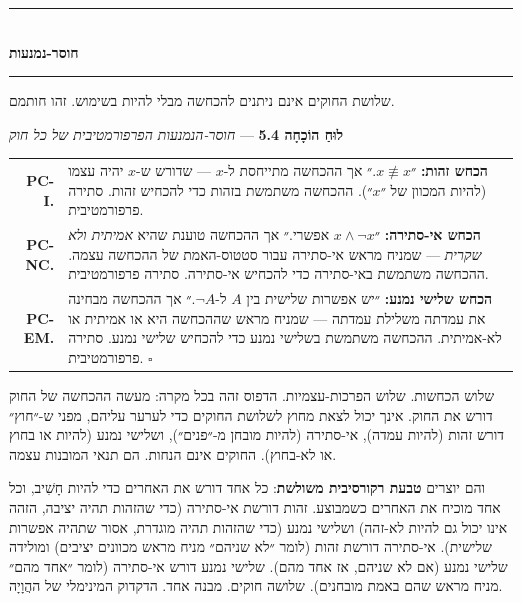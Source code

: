 \documentclass[10pt, openany, oneside]{book}
\renewcommand{\normalsize}{\fontsize{10}{13}\selectfont}
\renewcommand{\footnotesize}{\fontsize{8.5}{11}\selectfont}
\begin{document}

\begin{center}
    \rule{0.3\textwidth}{0.4pt}\\[0.5em]
    {\normalsize\bfseries\textsc{חוסר-נמנעות}}\\[0.3em]
    \rule{0.3\textwidth}{0.4pt}
\end{center}

\vspace{1em}

\noindent שלושת החוקים אינם ניתנים להכחשה מבלי להיות בשימוש. זהו חותמם.

\vspace{0.5em}

\textbf{לוּחַ הוֹכָחָה 5.4} --- \textit{חוסר-הנמנעות הפרפורמטיבית של כל חוק}

\vspace{0.5em}

{\footnotesize
\noindent\begin{tabular}{r p{}}
\textbf{PC-I.} & \textbf{הכחש זהות:} ״$x \not\equiv x$.״ אך ההכחשה מתייחסת ל-$x$ — שדורש ש-$x$ יהיה עצמו (להיות המכוון של ״$x$״). ההכחשה משתמשת בזהות כדי להכחיש זהות. סתירה פרפורמטיבית. \\[0.3em]
\textbf{PC-NC.} & \textbf{הכחש אי-סתירה:} ״$x \wedge \neg x$ אפשרי.״ אך ההכחשה טוענת שהיא \textit{אמיתית ולא שקרית} — שמניח מראש אי-סתירה עבור סטטוס-האמת של ההכחשה עצמה. ההכחשה משתמשת באי-סתירה כדי להכחיש אי-סתירה. סתירה פרפורמטיבית. \\[0.3em]
\textbf{PC-EM.} & \textbf{הכחש שלישי נמנע:} ״יש אפשרות שלישית בין $A$ ל-$\neg A$.״ אך ההכחשה מבחינה את עמדתה משלילת עמדתה — שמניח מראש שההכחשה היא או אמיתית או לא-אמיתית. ההכחשה משתמשת בשלישי נמנע כדי להכחיש שלישי נמנע. סתירה פרפורמטיבית. $\square$ \\[0.3em]
\end{tabular}
}

\vspace{0.8em}

\noindent שלוש הכחשות. שלוש הפרכות-עצמיות. הדפוס זהה בכל מקרה: מעשה ההכחשה של החוק דורש את החוק. אינך יכול לצאת מחוץ לשלושת החוקים כדי לערער עליהם, מפני ש-״חוץ״ דורש זהות (להיות עמדה), אי-סתירה (להיות מובחן מ-״פנים״), ושלישי נמנע (להיות או בחוץ או לא-בחוץ). החוקים אינם הנחות. הם תנאי המובנות עצמה.

והם יוצרים \textbf{טבעת רקורסיבית משולשת}: כל אחד דורש את האחרים כדי להיות חָשִׁיב, וכל אחד מוכיח את האחרים כשמבוצע. זהות דורשת אי-סתירה (כדי שהזהות תהיה יציבה, הזהה אינו יכול גם להיות לא-זהה) ושלישי נמנע (כדי שהזהות תהיה מוגדרת, אסור שתהיה אפשרות שלישית). אי-סתירה דורשת זהות (לומר ״לא שניהם״ מניח מראש מכוונים יציבים) ומולידה שלישי נמנע (אם לא שניהם, אז אחד מהם). שלישי נמנע דורש אי-סתירה (לומר ״אחד מהם״ מניח מראש שהם באמת מובחנים). שלושה חוקים. מבנה אחד. הדקדוק המינימלי של ההֲוָיָה.
\end{document}
